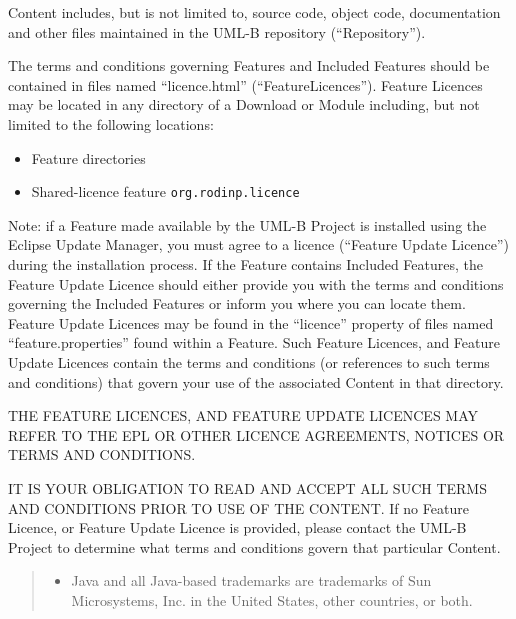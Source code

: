 Content includes, but is not limited to, source code, object code, documentation and other files maintained in the UML-B repository (``Repository'').

The terms and conditions governing Features and Included Features should be contained in files named ``licence.html'' (``FeatureLicences'').  
Feature Licences may be located in any directory of a Download or Module including, but not limited to the following locations:

\begin{itemize}
\item Feature directories

\item Shared-licence feature \texttt{org.rodinp.licence}
\end{itemize}

Note: if a Feature made available by the UML-B Project is
installed using the Eclipse Update Manager, you must agree to a
licence (``Feature Update Licence'') during the installation process.
If the Feature contains Included Features, the Feature Update
Licence should either provide you with the terms and conditions
governing the Included Features or inform you where you can locate
them.  Feature Update Licences may be found in the ``licence''
property of files named ``feature.properties'' found within a
Feature.  Such Feature Licences, and Feature Update
Licences contain the terms and conditions (or references to such
terms and conditions) that govern your use of the associated
Content in that directory.

THE FEATURE LICENCES, AND FEATURE UPDATE LICENCES MAY REFER
TO THE EPL OR OTHER LICENCE AGREEMENTS, NOTICES OR TERMS AND
CONDITIONS.

IT IS YOUR OBLIGATION TO READ AND ACCEPT ALL SUCH TERMS AND
CONDITIONS PRIOR TO USE OF THE CONTENT.  If no Feature
Licence, or Feature Update Licence is provided, please contact the
UML-B Project to determine what terms and conditions govern
that particular Content.
\begin{quote}
  \footnotesize

  \begin{itemize}
  \item  Java and all Java-based trademarks are trademarks of Sun
    Microsystems, Inc. in the United States, other countries, or
    both.
  \end{itemize}
\end{quote}

